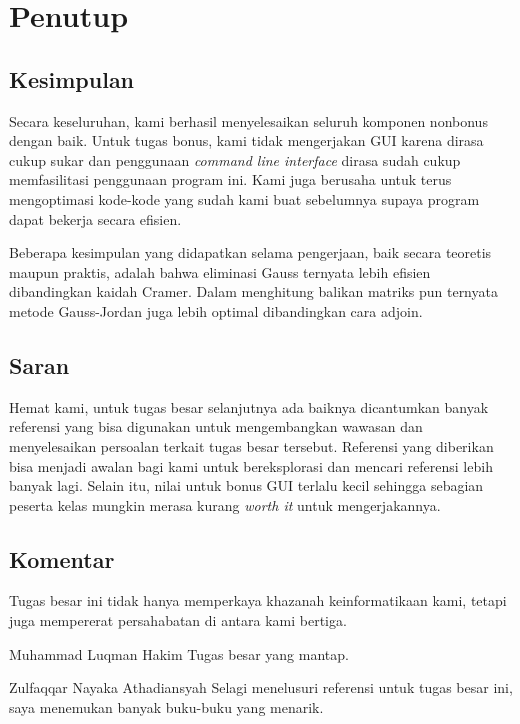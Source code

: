 \section{Penutup}
\subsection{Kesimpulan}
Secara keseluruhan, kami berhasil menyelesaikan seluruh komponen nonbonus dengan baik. Untuk tugas bonus, kami tidak mengerjakan GUI karena dirasa cukup sukar dan penggunaan \textit{command line interface} dirasa sudah cukup memfasilitasi penggunaan program ini. Kami juga berusaha untuk terus mengoptimasi kode-kode yang sudah kami buat sebelumnya supaya program dapat bekerja secara efisien.

Beberapa kesimpulan yang didapatkan selama pengerjaan, baik secara teoretis maupun praktis, adalah bahwa eliminasi Gauss ternyata lebih efisien dibandingkan kaidah Cramer. Dalam menghitung balikan matriks pun ternyata metode Gauss-Jordan juga lebih optimal dibandingkan cara adjoin.

\subsection{Saran}
Hemat kami, untuk tugas besar selanjutnya ada baiknya dicantumkan banyak referensi yang bisa digunakan untuk mengembangkan wawasan dan menyelesaikan persoalan terkait tugas besar tersebut. Referensi yang diberikan bisa menjadi awalan bagi kami untuk bereksplorasi dan mencari referensi lebih banyak lagi. Selain itu, nilai untuk bonus GUI terlalu kecil sehingga sebagian peserta kelas mungkin merasa kurang \textit{worth it} untuk mengerjakannya.

\subsection{Komentar}
    Tugas besar ini tidak hanya memperkaya khazanah keinformatikaan kami, tetapi juga mempererat persahabatan di antara kami bertiga.

\begin{rmr}{Muhammad Luqman Hakim}{}
    Tugas besar yang mantap.
\end{rmr}

\begin{rmr}{Zulfaqqar Nayaka Athadiansyah}{}
    Selagi menelusuri referensi untuk tugas besar ini, saya menemukan banyak buku-buku yang menarik.
\end{rmr}

